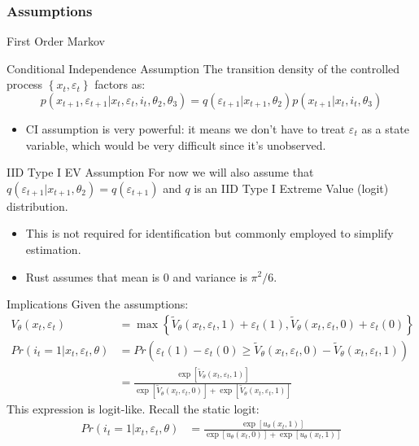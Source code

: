 \documentclass[xcolor=pdftex,dvipsnames,table,mathserif,aspectratio=169]{beamer}
\begin{document}
\begin{frame}
\frametitle{Assumptions}
\footnotesize
\begin{block}{First Order Markov}\end{block}\vspace{-0.5cm}
\begin{block}{Conditional Independence Assumption}
The transition density of the controlled process $\left\{x_{t},\varepsilon_{t}\right\}$ factors as:\[
p\left(x_{t+1},\varepsilon_{t+1}|x_{t},\varepsilon_{t},i_{t},\theta_{2},\theta_{3}\right)
= q\left(\varepsilon_{t+1}|x_{t+1},\theta_{2}\right)p\left(x_{t+1}|x_{t},i_{t},\theta_{3}\right)
\]
\end{block}

\begin{itemize}
	\item CI assumption is very powerful: it means we don't have to treat $\varepsilon_{t}$ as
	a state variable, which would be very difficult since it's unobserved.
\end{itemize}
\begin{block}{IID Type I EV Assumption}
For now we will also assume that $ q\left(\varepsilon_{t+1}|x_{t+1},\theta_{2}\right) =  q\left(\varepsilon_{t+1}\right)$ and $q$ is an IID Type I Extreme Value (logit) distribution.
\end{block}
\begin{itemize}
\item This is not required for identification but commonly employed to simplify estimation.
\item Rust assumes that mean is $0$ and variance is $\pi^2/6$.
\end{itemize}
\end{frame}



\begin{frame}{ Implications}
Given the assumptions:
\begin{align*}
V_{\theta}(x_t,\varepsilon_t) &= \max \left\{ \tilde V_{\theta} (x_t, \varepsilon_t, 1) + \varepsilon_{t}(1) ,\tilde V_{\theta} (x_t, \varepsilon_t, 0) + \varepsilon_{t}(0) \right\}\\
Pr(i_t=1 | x_t,\varepsilon_t,\theta) &= Pr\left(\varepsilon_{t}(1) - \varepsilon_{t}(0) \geq \tilde V_{\theta} (x_t, \varepsilon_t, 0) - \tilde V_{\theta} (x_t, \varepsilon_t, 1) \right) \\
&= \frac {\exp[\tilde V_{\theta} (x_t, \varepsilon_t, 1)]  }{\exp[\tilde V_{\theta} (x_t, \varepsilon_t, 0)] + \exp[\tilde V_{\theta} (x_t, \varepsilon_t, 1)]} 
\end{align*}
This expression is logit-like. Recall the static logit:
\begin{align*}
Pr(i_t=1 | x_t,\varepsilon_t,\theta) &= \frac {\exp[u_{\theta} (x_t, 1)]  }{\exp[u_{\theta} (x_t, 0)] + \exp[u_{\theta} (x_t, 1)]} 
\end{align*}
\end{frame}
\end{document}
